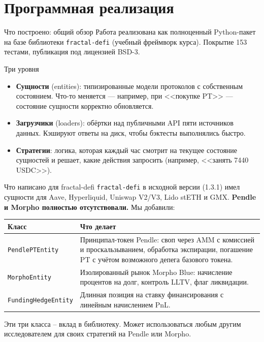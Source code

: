 \documentclass[11pt,aspectratio=169]{beamer}
\begin{document}
\section{Программная реализация}

\begin{frame}{Что построено: общий обзор}
  Работа реализована как полноценный Python-пакет на базе библиотеки
  \texttt{fractal-defi} (учебный фреймворк курса). Покрытие 153 тестами,
  публикация под лицензией BSD-3.

  \vspace{0.4em}
  \begin{block}{Три уровня}
    \footnotesize
    \begin{itemize}\itemsep0.2em
      \item \textbf{Сущности} (entities): типизированные модели протоколов
            с собственным состоянием. Что-то меняется --- например, при
            <<покупке PT>> --- состояние сущности корректно обновляется.
      \item \textbf{Загрузчики} (loaders): обёртки над публичными API
            пяти источников данных. Кэшируют ответы на диск, чтобы
            бэктесты выполнялись быстро.
      \item \textbf{Стратегии}: логика, которая каждый час смотрит на
            текущее состояние сущностей и решает, какие действия
            запросить (например, <<занять 7440 USDC>>).
    \end{itemize}
  \end{block}
\end{frame}

\begin{frame}{Что написано для fractal-defi}
  \texttt{fractal-defi} в исходной версии (1.3.1) имел сущности для
  Aave, Hyperliquid, Uniswap V2/V3, Lido stETH и GMX. \textbf{Pendle и
  Morpho полностью отсутствовали.} Мы добавили:

  \vspace{0.4em}
  \footnotesize
  \begin{tabular}{p{3.6cm}p{10.8cm}}
    \toprule
    Класс & Что делает \\
    \midrule
    \texttt{PendlePTEntity} & Принципал-токен Pendle: своп через AMM
    с комиссией и проскальзыванием, обработка экспирации, погашение
    PT с учётом возможного депега базового токена. \\
    \addlinespace[2pt]
    \texttt{MorphoEntity} & Изолированный рынок Morpho Blue: начисление
    процентов на долг, контроль LLTV, флаг ликвидации. \\
    \addlinespace[2pt]
    \texttt{FundingHedgeEntity} & Длинная позиция на ставку финансирования
    с линейным начислением PnL. \\
    \bottomrule
  \end{tabular}

  \vspace{0.6em}
  \normalsize
  Эти три класса -- вклад в библиотеку.
  Может использоваться любым другим исследователем для своих стратегий
  на Pendle или Morpho.
\end{frame}
\end{document}
